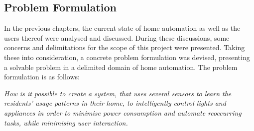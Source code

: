 \subsection{Problem Formulation}\label{problemFormulation}
In the previous chapters, the current state of home automation as well as the users thereof were analysed and discussed. During these discussions, some concerns and delimitations for the scope of this project were presented. Taking these into consideration, a concrete problem formulation was devised, presenting a solvable problem in a delimited domain of home automation. The problem formulation is as follows:

\emph{How is it possible to create a system, that uses several sensors to learn the residents’ usage patterns in their home, to intelligently control lights and appliances in order to minimise power consumption and automate reoccurring tasks, while minimising user interaction.}

